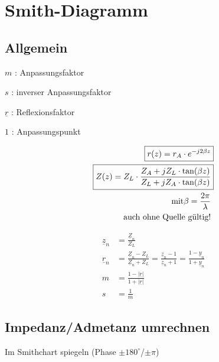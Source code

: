 \section{Smith-Diagramm}

\subsection{Allgemein} \label{sec:Smith_All}


$m$             : Anpassungsfaktor

$s$             : inverser Anpassungsfaktor

$\underline{r}$ : Reflexionsfaktor

$1$             : Anpassungspunkt

\begin{center}
    \begin{align*}
        \Aboxed{r(z)  = r_A \cdot e^{-j2\beta z}}                                              \\
        \Aboxed{Z(z)  = Z_L\cdot\frac{Z_A+jZ_L\cdot\tan(\beta z)}{Z_L+jZ_A\cdot\tan(\beta z)}} \\
        \text{mit} \beta = \frac{2\pi}{\lambda}                                                \\
        \text{auch ohne Quelle gültig!}
    \end{align*}
    
\end{center}
\begin{align*}
    \underline{z}_n & = \frac{\underline{Z}_n}{Z_L}                                                                                                                   \\
    \underline{r}_n & = \frac{\underline{Z}_n-Z_L}{\underline{Z}_n+Z_L}= \frac{\underline{z}_n-1}{\underline{z}_n+1}    = \frac{1-\underline{y}_n}{1+\underline{y}_n} \\
    m               & = \frac{1-|\underline{r}|}{1+|\underline{r}|}                                                                                                   \\
    s               & = \frac{1}{m}
\end{align*}

\subsection{Impedanz/Admetanz umrechnen}
Im Smithchart spiegeln (Phase $\pm 180^{\circ}$/$\pm \pi$)

